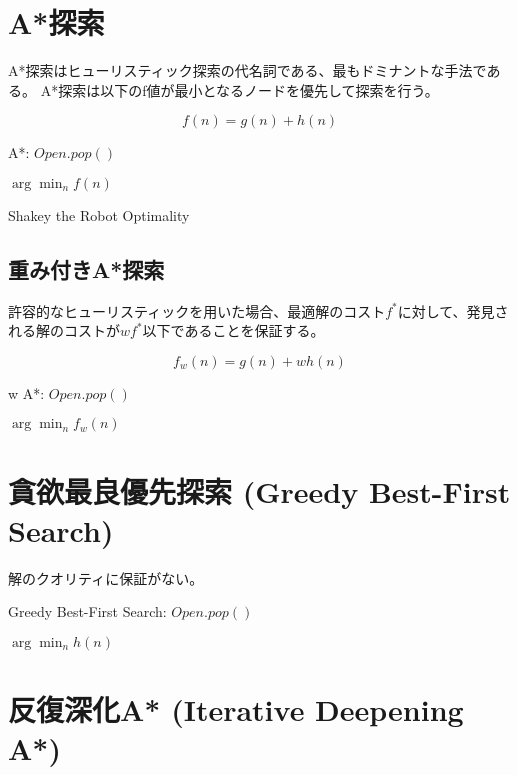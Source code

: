\documentclass{book}
\begin{document}
\section{A*探索}
\label{sec:astar-search}

A*探索はヒューリスティック探索の代名詞である、最もドミナントな手法である。
A*探索は以下のf値が最小となるノードを優先して探索を行う。

\begin{equation}
	f(n) = g(n) + h(n)
\end{equation}

\begin{algorithm}
\caption{A*: $Open.pop()$}
\label{alg:astar-open}
	\Return $\arg \min_n f(n)$
\end{algorithm}

Shakey the Robot
Optimality





\subsection{重み付きA*探索}
\label{sec:weighted-astar-search}

許容的なヒューリスティックを用いた場合、最適解のコスト$f^*$に対して、発見される解のコストが$w f^*$以下であることを保証する。

\begin{equation}
	f_w(n) = g(n) + w h(n)
\end{equation}

\begin{algorithm}
\caption{w A*: $Open.pop()$}
\label{alg:wastar-open}
	\Return $\arg \min_n f_w(n)$
\end{algorithm}

\section{貪欲最良優先探索 (Greedy Best-First Search)}
\label{sec:greedy-best-first-search}

解のクオリティに保証がない。

\begin{algorithm}
\caption{Greedy Best-First Search: $Open.pop()$}
\label{alg:gfs-open}
	\Return $\arg \min_n h(n)$
\end{algorithm}


\section{反復深化A* (Iterative Deepening A*)}
\label{sec:iterative-deepening-astar}
\end{document}
